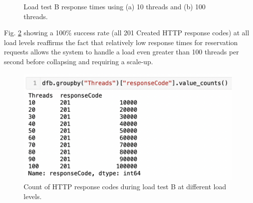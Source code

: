 \begin{figure}[H]
  \centering
  \caption{Load test B response times using (a) 10 threads and (b) 100 threads.}
  \label{fig:cs01-ltb-12}
\end{figure}

Fig. \ref{fig:cs01-ltb-3} showing a 100\% success rate (all 201 Created HTTP response codes) at all load levels reaffirms the fact that relatively low response times for reservation requests allows the system to handle a load even greater than 100 threads per second before collapsing and requiring a scale-up.


\begin{figure}[H]
  \centering
  \includegraphics[width=0.6\linewidth]{./assets/images/case-studies/cs01-ltb-3.png}
  \caption{Count of HTTP response codes during load test B at different load levels.}
  \label{fig:cs01-ltb-3}
\end{figure}

